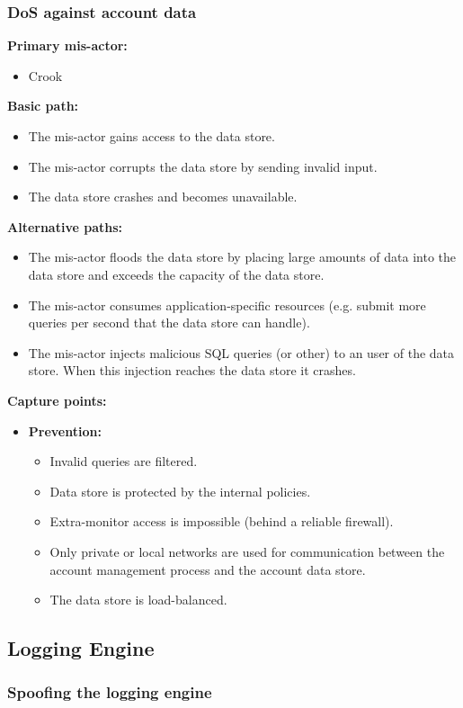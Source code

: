 \documentclass[a4paper,11pt]{report}
\begin{document}
\subsubsection{DoS against account data}
\textbf{Primary mis-actor:}
\begin{itemize}
\item Crook
\end{itemize}
\textbf{Basic path:}
\begin{itemize}
\item The mis-actor gains access to the data store.
\item The mis-actor corrupts the data store by sending invalid input.
\item The data store crashes and becomes unavailable.
\end{itemize}
\textbf{Alternative paths:}
\begin{itemize}
\item The mis-actor floods the data store by placing large amounts of data into the data store and exceeds the 
capacity of the data store.
\item The mis-actor consumes application-specific resources (e.g. submit more queries per second that the data 
store can handle).
\item The mis-actor injects malicious SQL queries (or other) to an user of the data store. When this injection reaches the data store it crashes.
\end{itemize}
\textbf{Capture points:}
\begin{itemize}
\item \textbf{Prevention:}
\begin{itemize}
\item Invalid queries are filtered.
\item Data store is protected by the internal policies.
\item Extra-monitor access is impossible (behind a reliable firewall).
\item Only private or local networks are used for communication between the account management process 
and the account data store.
\item The data store is load-balanced.
\end{itemize}
\end{itemize}
\subsection{Logging Engine}
\subsubsection{Spoofing the logging engine}
\end{document}
